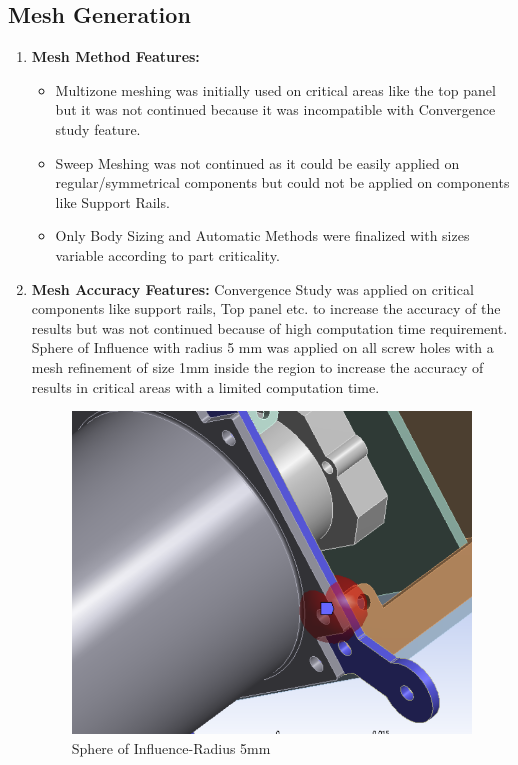 \documentclass[../../main.tex]{subfiles}
\begin{document}
\subsection {Mesh Generation}
    \begin{enumerate}
        \item \textbf{Mesh Method Features: }
        \begin{itemize}
            \item Multizone meshing was initially used on critical areas like the top panel but it was not continued because it was incompatible with Convergence study feature.
            \item Sweep Meshing was not continued as it could be easily applied on regular/symmetrical components but could not be applied on components like Support Rails.
            \item Only Body Sizing and Automatic Methods were finalized with sizes variable according to part criticality.
        \end{itemize}
        \item \textbf{Mesh Accuracy Features: }Convergence Study was applied on critical components like support rails, Top panel etc. to increase the accuracy of the results but was not continued because of high computation time requirement. Sphere of Influence with radius 5 mm was applied on all screw holes with a mesh refinement of size 1mm inside the region to increase the accuracy of results in critical areas with a limited computation time.
        \begin{figure}[H]
            \centering
            \includegraphics[scale=0.5]{Figures/Mechanical/spoi.PNG}
            \caption{Sphere of Influence-Radius 5mm}
            \label{fig:sys_CAD}
        \end{figure}
    \end{enumerate}
\end{document}
